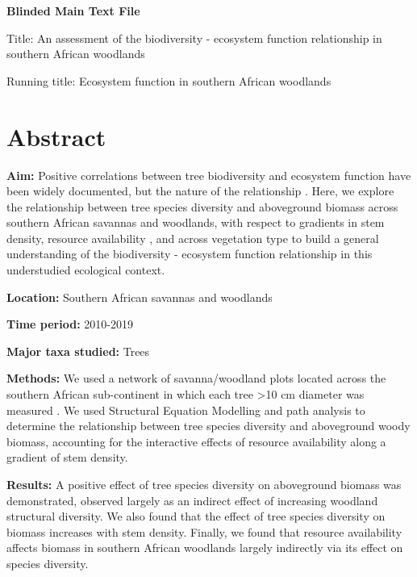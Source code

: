 \documentclass[11pt,a4paper]{article}
\begin{document}
\newpage{}

{\LARGE{\textbf{Blinded Main Text File}}}

\LARGE{Title: An assessment of the biodiversity - ecosystem function relationship in southern African woodlands}

\normalsize{Running title: Ecosystem function in southern African woodlands}

\section{Abstract}

\textbf{Aim:} Positive correlations between tree biodiversity and ecosystem function have been widely documented, but the nature of the relationship . Here, we explore the relationship between tree species diversity and aboveground biomass across southern African savannas and woodlands, with respect to gradients in stem density, resource availability , and across vegetation type to build a general understanding of the biodiversity - ecosystem function relationship in this understudied ecological context.

\textbf{Location:} Southern African savannas and woodlands

\textbf{Time period:} 2010-2019

\textbf{Major taxa studied:} Trees

\textbf{Methods:} We used a network of \nplots{} savanna/woodland plots located across the southern African sub-continent in which each tree >10 cm diameter was measured . We used Structural Equation Modelling and path analysis to determine the relationship between tree species diversity and aboveground woody biomass, accounting for the interactive effects of resource availability  along a gradient of stem density.

\textbf{Results:} A positive effect of tree species diversity on aboveground biomass was demonstrated, observed largely as an indirect effect of increasing woodland structural diversity. We also found that the effect of tree species diversity on biomass increases with stem density. Finally, we found that resource availability affects biomass in southern African woodlands largely indirectly via its effect on species diversity.
\end{document}
